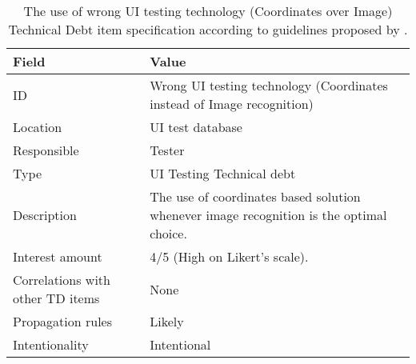         
    \begin{table}[!htbp]
		\centering
		\tabulinesep=1.2mm
		\begin{tabu} to \textwidth {|X|X[3]|}
			
			\hline
			\textbf{Field} & \textbf{Value} \\ 
			\hline
			
			ID & Wrong UI testing technology (Coordinates instead of Image recognition)\\
			\hline
			
			Location & UI test database \\
			\hline
			
			Responsible & Tester \\
			\hline
			
			Type & UI Testing Technical debt \\
			\hline	
			
			Description & The use of coordinates based solution whenever image recognition is the optimal choice.\\
			\hline
			
			
			
			Interest amount &  4/5 (High on Likert's scale). \\
			\hline
			
			
			
			Correlations with other TD items & None\\
			\hline 	 
			
			
			
			Propagation rules & Likely\\
			\hline
			
			Intentionality & Intentional \\
			\hline 	 	
			
		\end{tabu}
		\caption[Use of wrong UI testing technology - Coordinates over Image - TD item specification]{The use of wrong UI testing technology (Coordinates over Image) Technical Debt item specification according to guidelines proposed by \cite{mapping_study_td}.}
		\label{tab:res-coordinates-vs-image}
	\end{table}
        
